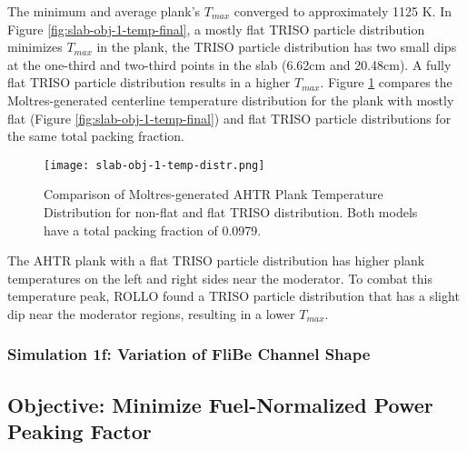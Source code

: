 The minimum and average plank's $T_{max}$ converged to approximately 
1125 K. 
In Figure \ref{fig:slab-obj-1-temp-final}, a mostly flat TRISO 
particle distribution minimizes $T_{max}$ in the plank, the TRISO particle distribution 
has two small dips at the one-third and two-third points in the slab (6.62cm and 20.48cm). 
A fully flat TRISO particle distribution results in a higher $T_{max}$.
Figure \ref{fig:slab-obj-1-temp-distr} compares the Moltres-generated centerline 
temperature distribution for the plank with mostly flat (Figure 
\ref{fig:slab-obj-1-temp-final}) and flat TRISO particle distributions for the same 
total packing fraction.
\begin{figure}[]
    \centering
    \texttt{[image: slab-obj-1-temp-distr.png]}
    \caption{Comparison of Moltres-generated AHTR Plank Temperature Distribution for non-flat and flat
    TRISO distribution. Both models have a total packing fraction of 0.0979.}
    \label{fig:slab-obj-1-temp-distr}
\end{figure}
The AHTR plank with a flat TRISO particle distribution has higher plank temperatures 
on the left and right sides near the moderator. 
To combat this temperature peak, ROLLO found a TRISO particle distribution that 
has a slight dip near the moderator regions, resulting in a lower $T_{max}$.

\subsubsection{Simulation 1f: Variation of FliBe Channel Shape}

\subsection{Objective: Minimize Fuel-Normalized Power Peaking Factor}

